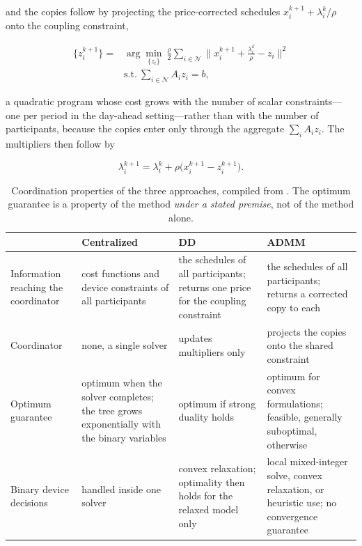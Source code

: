 \documentclass[conference]{IEEEtran}
\begin{document}
and the copies follow by projecting the price-corrected schedules $x_i^{k+1} + \lambda_i^{k}/\rho$ onto the coupling constraint,

\begin{equation}
\begin{aligned}
\{z_i^{k+1}\} = {}&\arg\min_{\{z_i\}} \ \frac{\rho}{2}\sum_{i\in\mathcal{N}}\Big\lVert x_i^{k+1} + \frac{\lambda_i^{k}}{\rho} - z_i\Big\rVert^{2}\\
&\text{s.t.} \ \sum_{i\in\mathcal{N}} A_i z_i = b ,
\end{aligned}
\label{eq:admm-z-proj}
\end{equation}

a quadratic program whose cost grows with the number of scalar constraints---one per period in the day-ahead setting---rather than with the number of participants, because the copies enter only through the aggregate $\sum_i A_i z_i$. The multipliers then follow by

\begin{equation}
\lambda_i^{k+1} = \lambda_i^{k} + \rho\big( x_i^{k+1} - z_i^{k+1} \big).
\label{eq:admm-lambda}
\end{equation}


\begin{table}[!t]
\centering
\caption{Coordination properties of the three approaches, compiled from \cite{Diekerhof2018,OlivellaRosell2020}. The optimum guarantee is a property of the method \emph{under a stated premise}, not of the method alone.}
\label{tab:comparison}
\footnotesize
\begin{tabular}{@{}p{}p{}p{}p{}@{}}
\hline
 & Centralized & DD & ADMM \\
\hline
Information reaching the coordinator
& cost functions and device constraints of all participants
& the schedules of all participants; returns one price for the coupling constraint
& the schedules of all participants; returns a corrected copy to each \\
Coordinator
& none, a single solver
& updates multipliers only
& projects the copies onto the shared constraint \\
Optimum guarantee
& optimum when the solver completes; the tree grows exponentially with the binary variables
& optimum if strong duality holds
& optimum for convex formulations; feasible, generally suboptimal, otherwise \\
Binary device decisions
& handled inside one solver
& convex relaxation; optimality then holds for the relaxed model only
& local mixed-integer solve, convex relaxation, or heuristic use; no convergence guarantee \\
\hline
\end{tabular}
\end{table}
\end{document}
